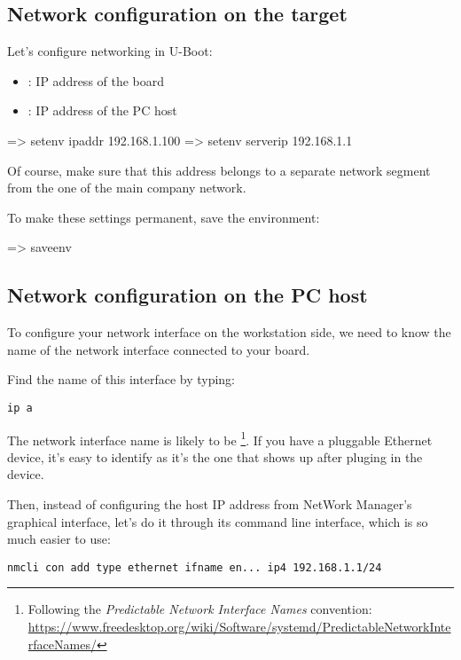 \subsection{Network configuration on the target}

Let's configure networking in U-Boot:

\begin{itemize}
\item {}: IP address of the board
\item {}: IP address of the PC host
\end{itemize}

\begin{ubootinput}
=> setenv ipaddr 192.168.1.100
=> setenv serverip 192.168.1.1
\end{ubootinput}

Of course, make sure that this address belongs to a separate network
segment from the one of the main company network.

To make these settings permanent, save the environment:

\begin{ubootinput}
=> saveenv
\end{ubootinput}

\subsection{Network configuration on the PC host}

To configure your network interface on the workstation side, we need
to know the name of the network interface connected to your board.

Find the name of this interface by typing:

\begin{verbatim}
ip a
\end{verbatim}

The network interface name is likely to be
\footnote{Following the {\em Predictable Network Interface
Names} convention:
\url{https://www.freedesktop.org/wiki/Software/systemd/PredictableNetworkInterfaceNames/}}.
If you have a pluggable Ethernet device, it's easy to identify as it's
the one that shows up after pluging in the device.

Then, instead of configuring the host IP address from NetWork Manager's
graphical interface, let's do it through its command line interface,
which is so much easier to use:

\begin{verbatim}
nmcli con add type ethernet ifname en... ip4 192.168.1.1/24
\end{verbatim}

